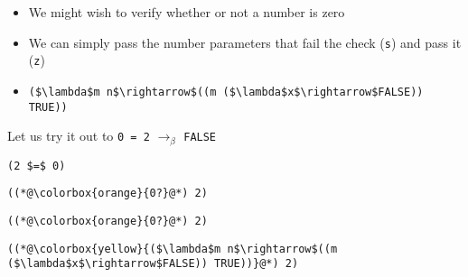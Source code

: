 \documentclass{beamer}
\begin{document}
\begin{frame}[fragile]{\CurrentSection}
\begin{block}{\CurrentSubSection}
\begin{itemize}
\item We might wish to verify whether or not a number is zero
\item We can simply pass the number parameters that fail the check (\texttt{s}) and pass it (\texttt{z})
\item \lstset{basicstyle=\ttfamily\small}\lstset{numbers=none}\lstset{language=ML}\begin{lstlisting}
($\lambda$m n$\rightarrow$((m ($\lambda$x$\rightarrow$FALSE)) TRUE))
\end{lstlisting}


\end{itemize}

\end{block}


\end{frame}

\begin{frame}[fragile]{\CurrentSection}
\begin{block}{\CurrentSubSection}
Let us try it out to \texttt{0 = 2} $\rightarrow_\beta$ \texttt{FALSE}
\end{block}


\end{frame}

\begin{frame}[fragile]{\CurrentSection}
\lstset{basicstyle=\ttfamily\small}\lstset{numbers=none}\lstset{language=ML}\begin{lstlisting}
(2 $=$ 0)
\end{lstlisting}
\pause\lstset{language=ML}\begin{lstlisting}
((*@\colorbox{orange}{0?}@*) 2)
\end{lstlisting}

\end{frame}

\begin{frame}[fragile]{\CurrentSection}
\lstset{basicstyle=\ttfamily\small}\lstset{numbers=none}\lstset{language=ML}\begin{lstlisting}
((*@\colorbox{orange}{0?}@*) 2)
\end{lstlisting}
\pause\lstset{language=ML}\begin{lstlisting}
((*@\colorbox{yellow}{($\lambda$m n$\rightarrow$((m ($\lambda$x$\rightarrow$FALSE)) TRUE))}@*) 2)
\end{lstlisting}

\end{frame}
\end{document}
